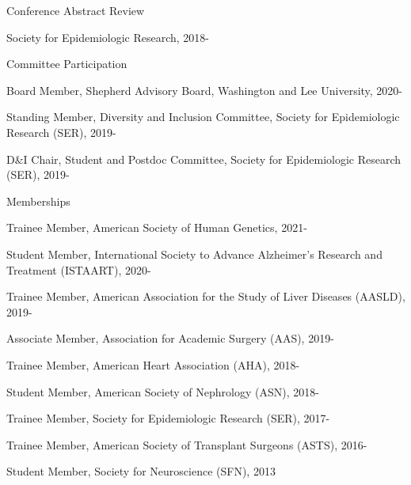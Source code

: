 \documentclass[10pt]{article}
\renewcommand{\section}[1]{\pagebreak[3]%
    \vspace{1.3\baselineskip}%
    \phantomsection\addcontentsline{toc}{section}{#1}%
    \noindent\llap{\scshape\smash{\parbox[t]{\marginparwidth}{\hyphenpenalty=10000\raggedright #1}}}%
    \vspace{-\baselineskip}\par}
\begin{document}
\vspace{2mm}

Conference Abstract Review

\begin{innerlist}

\item Society for Epidemiologic Research, 2018-

\end{innerlist}

\vspace{2mm}

Committee Participation

\begin{innerlist}

\item Board Member, Shepherd Advisory Board, Washington and Lee University, 2020-
\item Standing Member, Diversity and Inclusion Committee, Society for Epidemiologic Research (SER), 2019-
\item D\&I Chair, Student and Postdoc Committee, Society for Epidemiologic Research (SER), 2019-

\end{innerlist}

\vspace{2mm}

Memberships

\begin{innerlist}

\item Trainee Member, American Society of Human Genetics, 2021-
\item Student Member, International Society to Advance Alzheimer's Research and Treatment (ISTAART), 2020-
\item Trainee Member, American Association for the Study of
  Liver Diseases (AASLD), 2019-
\item Associate Member, Association for Academic Surgery (AAS), 2019-
\item Trainee Member, American Heart Association (AHA), 2018-
\item Student Member, American Society of Nephrology (ASN), 2018-
\item Trainee Member, Society for Epidemiologic Research (SER), 2017-
\item Trainee Member, American Society of Transplant Surgeons (ASTS), 2016-
\item Student Member, Society for Neuroscience (SFN), 2013

\end{innerlist}

\end{document}
